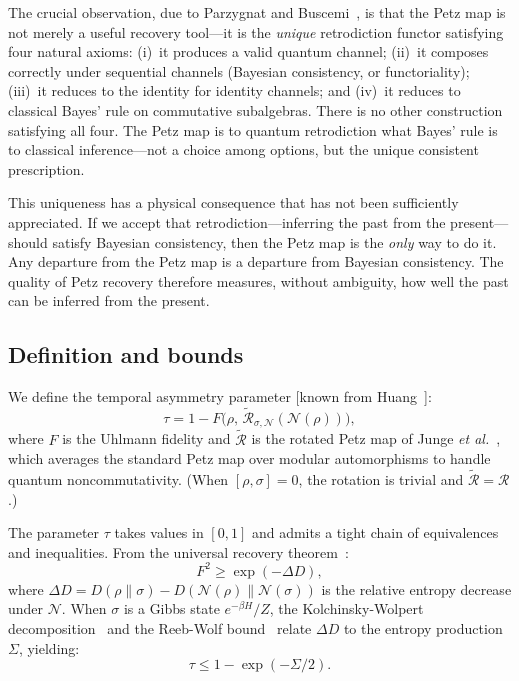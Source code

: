 \documentclass[12pt]{article}
\theoremstyle{definition}
\theoremstyle{remark}
\newcommand{\Petz}{\mathcal{R}}
\newcommand{\chan}{\mathcal{N}}
\newcommand{\tauasym}{\tau}
\begin{document}
The crucial observation, due to Parzygnat and
Buscemi~\cite{Parzygnat2023}, is that the Petz map is not merely
a useful recovery tool---it is the \emph{unique} retrodiction
functor satisfying four natural axioms: (i)~it produces a valid
quantum channel; (ii)~it composes correctly under sequential channels
(Bayesian consistency, or functoriality); (iii)~it reduces to the
identity for identity channels; and (iv)~it reduces to classical
Bayes' rule on commutative subalgebras.  There is no other
construction satisfying all four.  The Petz map is to quantum
retrodiction what Bayes' rule is to classical inference---not a
choice among options, but the unique consistent prescription.

This uniqueness has a physical consequence that has not been
sufficiently appreciated.  If we accept that retrodiction---inferring
the past from the present---should satisfy Bayesian consistency,
then the Petz map is the \emph{only} way to do it.  Any departure
from the Petz map is a departure from Bayesian consistency.
The quality of Petz recovery therefore measures, without ambiguity,
how well the past can be inferred from the present.

\subsection{Definition and bounds}

We define the temporal asymmetry parameter [known from
Huang~\cite{Huang2026}]:
\begin{equation}
\tauasym = 1 - F\!\big(\rho,\,
\tilde{\Petz}_{\sigma,\chan}(\chan(\rho))\big),
\label{eq:tau_def}
\end{equation}
where $F$ is the Uhlmann fidelity and $\tilde{\Petz}$ is the
rotated Petz map of Junge \emph{et al.}~\cite{Junge2018},
which averages the standard Petz map over modular
automorphisms to handle quantum noncommutativity.
(When $[\rho, \sigma] = 0$, the rotation is trivial and
$\tilde{\Petz} = \Petz$.)

The parameter $\tauasym$ takes values in $[0,1]$ and admits a
tight chain of equivalences and inequalities.  From the universal
recovery theorem~\cite{Junge2018}:
\begin{equation}
F^2 \geq \exp(-\Delta D),
\label{eq:jrsww}
\end{equation}
where $\Delta D = D(\rho\|\sigma) - D(\chan(\rho)\|\chan(\sigma))$
is the relative entropy decrease under $\chan$.
When $\sigma$ is a Gibbs state $e^{-\beta H}/Z$, the
Kolchinsky-Wolpert decomposition~\cite{Kolchinsky2017} and the
Reeb-Wolf bound~\cite{ReebWolf2014} relate $\Delta D$ to the
entropy production $\Sigma$, yielding:
\begin{equation}
\tauasym \leq 1 - \exp(-\Sigma/2).
\label{eq:tau_bound}
\end{equation}
\end{document}
